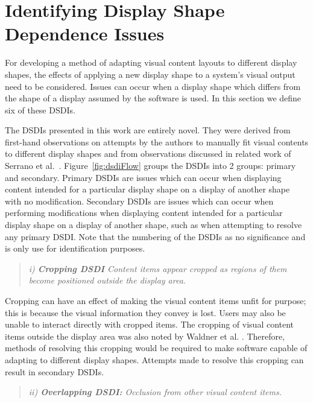 \documentclass{bmcart}
\begin{document}
\section*{Identifying Display Shape Dependence Issues}
\label{sec:problem}

For developing a method of adapting visual content layouts to different display shapes, the effects of applying a new display shape to a system's visual output need to be considered.
Issues can occur when a display shape which differs from the shape of a display assumed by the software is used.
In this section we define six of these \acp{DSDI}.

The \acp{DSDI} presented in this work are entirely novel.
They were derived from first-hand observations on attempts by the authors to manually fit visual contents to different display shapes and from observations discussed in related work of Serrano et al.~\cite{Serrano2016,Serrano2017}.
Figure~\ref{fig:dsdiFlow} groups the \acp{DSDI} into 2 groups: primary and secondary.
Primary \acp{DSDI} are issues which can occur when displaying content intended for a particular display shape on a display of another shape with no modification.
Secondary \acp{DSDI} are issues which can occur when performing modifications when displaying content intended for a particular display shape on a display of another shape, such as when attempting to resolve any primary \ac{DSDI}.
Note that the numbering of the \acp{DSDI} as no significance and is only use for identification purposes.


\begin{quote}\emph{i) \textbf{Cropping \ac{DSDI}} Content items appear cropped as regions of them become positioned outside the display area.}\end{quote}

Cropping can have an effect of making the visual content items unfit for purpose; this is because the visual information they convey is lost.
Users may also be unable to interact directly with cropped items.
The cropping of visual content items outside the display area was also noted by Waldner et al. \cite{Waldner2011}.
Therefore, methods of resolving this cropping would be required to make software capable of adapting to different display shapes.
Attempts made to resolve this cropping can result in secondary \acp{DSDI}.

\begin{quote}\emph{ii) \textbf{Overlapping \ac{DSDI}:} Occlusion from other visual content items.}\end{quote}
\end{document}
